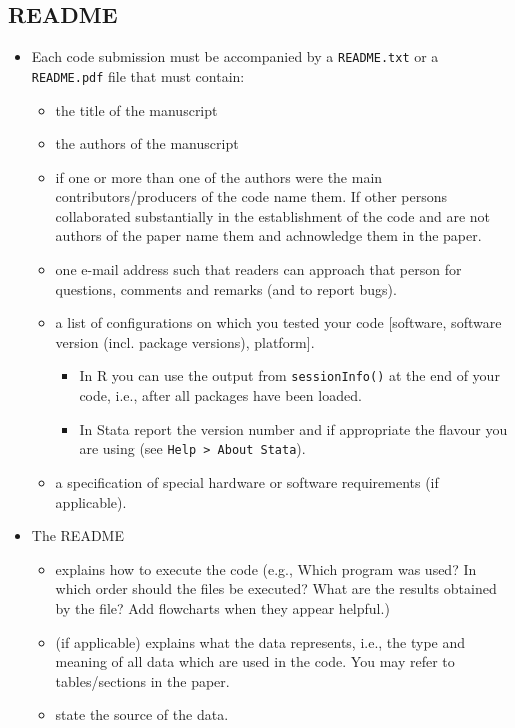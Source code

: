 \documentclass[12pt,a4paper]{article}
\begin{document}
\subsection{README}

\begin{itemize}
\item Each code submission {must} be accompanied by a \texttt{README.txt} or a
  \texttt{README.pdf} file that must contain:
  \begin{itemize}
  \item the title of the manuscript
  \item the authors of the manuscript
  \item if one or more than one of the authors were the main contributors/producers
    of the code name them. If other persons collaborated substantially in the
    establishment of the code and are not authors of the paper name them and
    achnowledge them in the paper.
  \item one e-mail address such that readers can approach that person for
    questions, comments and remarks (and to report bugs).
  \item a list of configurations on which you tested your code [software,
    software version (incl. package versions), platform].
    \begin{itemize}
    \item In \textsf{R} you can use the output from \texttt{sessionInfo()} at
      the end of your code, i.e., after all packages have been loaded.
    \item In \textsf{Stata} report the version number and if appropriate the
      flavour you are using (see \texttt{Help > About Stata}).
    \end{itemize}
  \item a specification of special hardware or software requirements (if
    applicable).
  \end{itemize}
  \item The README
  \begin{itemize}
  \item explains how to execute the code (e.g., Which program was used? In which
    order should the files be executed? What are the results obtained by the
    file? Add flowcharts when they appear helpful.)
  \item (if applicable) explains what the data represents, i.e., the type and
    meaning of all data which are used in the code. You may refer to
    tables/sections in the paper.
  \item state the source of the data.
  \end{itemize}
\end{itemize}
\end{document}

